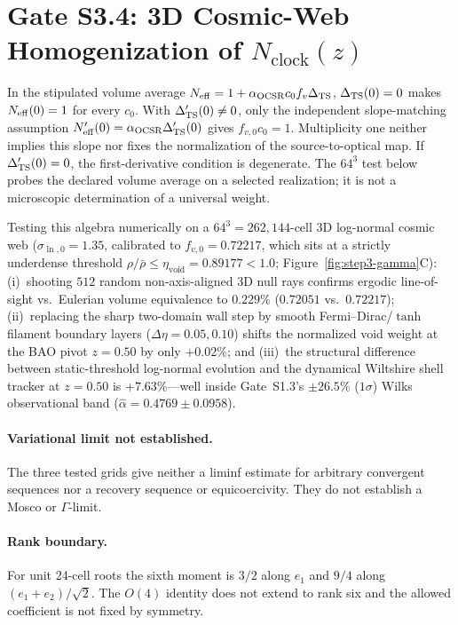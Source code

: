 \documentclass[11pt,a4paper]{article}
\begin{document}
\section{\texorpdfstring{Gate S3.4: 3D Cosmic-Web Homogenization of $N_{\mathrm{clock}}(z)$}{Gate S3.4: 3D Cosmic-Web Homogenization of N\_clock(z)}}
\label{sec:step3-voidclock}
In the stipulated volume average
$N_{\rm eff}=1+\alpha_{\rm OCSR}c_0 f_v\Delta_{\rm TS}$,
$\Delta_{\rm TS}(0)=0$ makes $N_{\rm eff}(0)=1$ for every $c_0$.
With $\Delta'_{\rm TS}(0)\ne0$, only the independent slope-matching
assumption $N'_{\rm eff}(0)=\alpha_{\rm OCSR}\Delta'_{\rm TS}(0)$
gives $f_{v,0}c_0=1$. Multiplicity one neither implies this slope
nor fixes the normalization of the source-to-optical map. If
$\Delta'_{\rm TS}(0)=0$, the first-derivative condition is degenerate.
The $64^3$ test below probes the declared volume average on a selected
realization; it is not a microscopic determination of a universal weight.

Testing this algebra numerically on a $64^3 = 262{,}144$-cell 3D log-normal cosmic web ($\sigma_{\ln,0} = 1.35$, calibrated to $f_{v,0} = 0.72217$, which sits at a strictly underdense threshold $\rho/\bar{\rho} \le \eta_{\mathrm{void}} = 0.89177 < 1.0$; Figure~\ref{fig:step3-gamma}C):
(i)~shooting $512$ random non-axis-aligned 3D null rays confirms ergodic line-of-sight vs.\ Eulerian volume equivalence to $0.229\%$ ($0.72051$ vs.\ $0.72217$);
(ii)~replacing the sharp two-domain wall step by smooth Fermi--Dirac/$\tanh$ filament boundary layers ($\Delta\eta = 0.05, 0.10$) shifts the normalized void weight at the BAO pivot $z = 0.50$ by only $+0.02\%$; and
(iii)~the structural difference between static-threshold log-normal evolution and the dynamical Wiltshire shell tracker at $z = 0.50$ is $+7.63\%$---well inside Gate~S1.3's $\pm 26.5\%$ ($1\sigma$) Wilks observational band ($\hat{\alpha} = 0.4769 \pm 0.0958$).

\paragraph{Variational limit not established.} The three tested grids give neither a liminf estimate for arbitrary convergent sequences nor a recovery sequence or equicoercivity. They do not establish a Mosco or $\Gamma$-limit.

\paragraph{Rank boundary.} For unit 24-cell roots the sixth moment is $3/2$ along $e_1$ and $9/4$ along $(e_1+e_2)/\sqrt2$. The $O(4)$ identity does not extend to rank six and the allowed coefficient is not fixed by symmetry.
\end{document}
